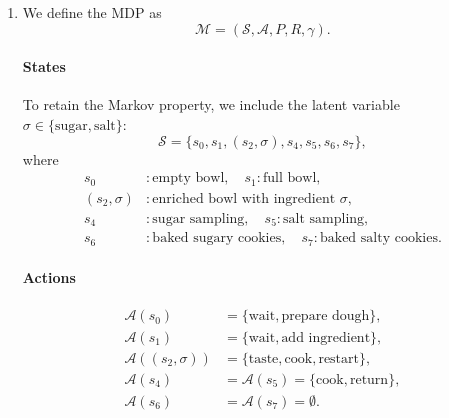 \documentclass{article}
\begin{document}
\begin{enumerate}
\begin{textbf}
In particular, the agent always chooses actions that lead to the sugary cookies and avoids all actions leading to the salty outcome.
\end{textbf}
\item

We define the MDP as
\[
\mathcal{M} = (\mathcal{S}, \mathcal{A}, P, R, \gamma).
\]

\paragraph{States}
To retain the Markov property, we include the latent variable $\sigma \in \{\text{sugar}, \text{salt}\}$:
\[
\mathcal{S} = \{
s_0, s_1, (s_2,\sigma), s_4, s_5, s_6, s_7
\},
\]
where
\[
\begin{aligned}
s_0 &: \text{empty bowl}, \quad
s_1 : \text{full bowl}, \\
(s_2,\sigma) &: \text{enriched bowl with ingredient } \sigma, \\
s_4 &: \text{sugar sampling}, \quad
s_5 : \text{salt sampling}, \\
s_6 &: \text{baked sugary cookies}, \quad
s_7 : \text{baked salty cookies}.
\end{aligned}
\]

\paragraph{Actions}
\[
\begin{aligned}
\mathcal{A}(s_0) &= \{\text{wait}, \text{prepare dough}\}, \\
\mathcal{A}(s_1) &= \{\text{wait}, \text{add ingredient}\}, \\
\mathcal{A}((s_2,\sigma)) &= \{\text{taste}, \text{cook}, \text{restart}\}, \\
\mathcal{A}(s_4) &= \mathcal{A}(s_5) = \{\text{cook}, \text{return}\}, \\
\mathcal{A}(s_6) &= \mathcal{A}(s_7) = \emptyset.
\end{aligned}
\]


\end{enumerate}
\end{document}
